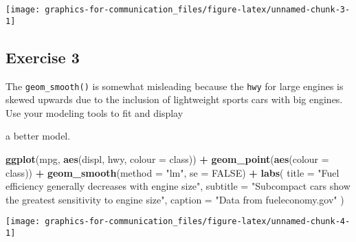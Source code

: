 \documentclass[]{book}
\newenvironment{Shaded}{\begin{snugshade}}{\end{snugshade}}
\newcommand{\DataTypeTok}[1]{\textcolor[rgb]{0.13,0.29,0.53}{#1}}
\newcommand{\KeywordTok}[1]{\textcolor[rgb]{0.13,0.29,0.53}{\textbf{#1}}}
\newcommand{\NormalTok}[1]{#1}
\newcommand{\OperatorTok}[1]{\textcolor[rgb]{0.81,0.36,0.00}{\textbf{#1}}}
\newcommand{\OtherTok}[1]{\textcolor[rgb]{0.56,0.35,0.01}{#1}}
\newcommand{\StringTok}[1]{\textcolor[rgb]{0.31,0.60,0.02}{#1}}
\theoremstyle{definition}
\theoremstyle{definition}
\theoremstyle{definition}
\theoremstyle{remark}
\begin{document}
\begin{center}\texttt{[image: graphics-for-communication\_files/figure-latex/unnamed-chunk-3-1]} \end{center}

\hypertarget{exercise-3-51}{%
\subsection{Exercise 3}\label{exercise-3-51}}

The \texttt{geom\_smooth()} is somewhat misleading because the
\texttt{hwy} for large engines is skewed upwards due to the inclusion of
lightweight sports cars with big engines. Use your modeling tools to fit
and display

a better model.

\begin{Shaded}
\begin{Highlighting}[]
\KeywordTok{ggplot}\NormalTok{(mpg, }\KeywordTok{aes}\NormalTok{(displ, hwy, }\DataTypeTok{colour =}\NormalTok{ class)) }\OperatorTok{+}
\StringTok{  }\KeywordTok{geom_point}\NormalTok{(}\KeywordTok{aes}\NormalTok{(}\DataTypeTok{colour =}\NormalTok{ class)) }\OperatorTok{+}
\StringTok{  }\KeywordTok{geom_smooth}\NormalTok{(}\DataTypeTok{method =} \StringTok{"lm"}\NormalTok{, }\DataTypeTok{se =} \OtherTok{FALSE}\NormalTok{) }\OperatorTok{+}
\StringTok{  }\KeywordTok{labs}\NormalTok{(}
    \DataTypeTok{title =} \StringTok{"Fuel efficiency generally decreases with engine size"}\NormalTok{,}
    \DataTypeTok{subtitle =} \StringTok{"Subcompact cars show the greatest sensitivity to engine size"}\NormalTok{,}
    \DataTypeTok{caption =} \StringTok{"Data from fueleconomy.gov"}
\NormalTok{  )}
\end{Highlighting}
\end{Shaded}

\begin{center}\texttt{[image: graphics-for-communication\_files/figure-latex/unnamed-chunk-4-1]} \end{center}
\end{document}
